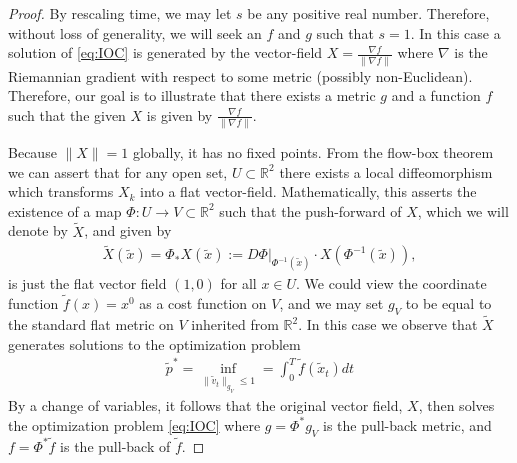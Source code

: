 \documentclass[conference]{IEEEtran}
\begin{document}
\begin{proof}
	By rescaling time, we may let $s$ be any positive real number.
	Therefore, without loss of generality, we will seek an $f$ and $g$ such that $s=1$.
	In this case a solution of \eqref{eq:IOC} is generated by the vector-field $X = \frac{\nabla f}{ \| \nabla f\|}$ where $\nabla$ is the Riemannian gradient with respect to some metric (possibly non-Euclidean).
	Therefore, our goal is to illustrate that there exists a metric $g$ and a function $f$ such that the given $X$ is given by $\frac{\nabla f}{ \| \nabla f\|}$.

	Because $\| X \| = 1$ globally, it has no fixed points.
	From the flow-box theorem \cite[Theorem 4.1.14]{MTA} we can assert that for any open set, $U \subset \mathbb{R}^2$ there exists a local diffeomorphism which transforms $X_k$ into a flat vector-field.
	Mathematically, this asserts the existence of a map $\Phi : U \to V \subset \mathbb{R}^2$ such that the push-forward of $X$, which we will denote by $\tilde{X}$, and given by
	\begin{align*}
		\tilde{X}(\tilde{x}) = \Phi_* X(\tilde{x}) := \left. D\Phi \right|_{\Phi^{-1}(\tilde{x}) } \cdot X(  \Phi^{-1}(\tilde{x}) ),
	\end{align*}
	is just the flat vector field $(1,0)$ for all $x \in U$.
	We could view the coordinate function $\tilde{f}(x) = x^0$ as a cost function on $V$,
	and we may set $g_V$ to be equal to the standard flat metric on $V$ inherited from $\mathbb{R}^2$.
	In this case we observe that $\tilde{X}$ generates solutions to the optimization problem
	\begin{align*}
		\tilde{p}^* = \inf_{ \| \tilde{v}_t \|_{g_V} \leq 1} = \int_0^T \tilde{f}( \tilde{x}_t ) dt
	\end{align*}
	By a change of variables, it follows that the original vector field, $X$, then solves the optimization problem \eqref{eq:IOC}
	where $g = \Phi^* g_V$ is the pull-back metric, and $f = \Phi^* \tilde{f}$ is the pull-back of $\tilde{f}$.
\end{proof}





\end{document}
